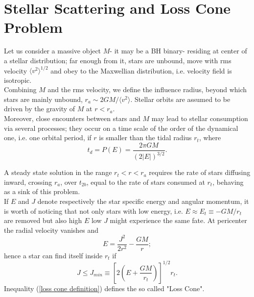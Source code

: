 \newpage















\section{Stellar Scattering and Loss Cone Problem}\label{sec:Loss Cone}
\cite{lightman_loss-cone}Let us consider a massive object $M$- it may be a BH binary- residing at center of a stellar distribution; far enough from it, stars are unbound, move with rms velocity $\langle v^2\rangle^{1/2}$ and obey to the Maxwellian distribution, i.e. velocity field is isotropic.\\Combining $M$ and the rms velocity, we define the influence radius, beyond which stars are mainly unbound, $r_a\sim 2GM/\langle v^2\rangle$. Stellar orbits are assumed to be driven by the gravity of $M$ at $r<r_a$.\\Moreover, close encounters between stars and $M$ may lead to stellar consumption via several processes; they occur on a time scale of the order of the dynamical one, i.e. one orbital period, if $r$ is smaller than the tidal radius $r_t$, where
\begin{equation}
    t_d=P(E)=\frac{2\pi GM}{(2|E|)^{3/2}}.
\end{equation}

A steady state solution in the range $r_t<r<r_a$ requires the rate of stars diffusing inward, crossing $r_a$, over $t_{2b}$, equal to the rate of stars consumed at $r_t$, behaving as a sink of this problem. \\If $E$ and $J$ denote respectively the star specific energy and angular momentum, it is worth of noticing  that  not only stars with low energy, i.e. $E\approx E_t\equiv -GM/r_t$ are removed but also high $E$ low $J$ might experience the same fate. At pericenter the radial velocity vanishes and 
\begin{equation}
    E=\frac{J^2}{2r^2}-\frac{GM}{r};
\end{equation}
hence a star can find itself inside $r_t$ if 
\begin{equation}\label{loss cone definition}
    J\le J_{min}\equiv \left[2\left(E+\frac{GM}{r_t}\right)\right]^{1/2}r_t.
\end{equation}
Inequality (\ref{loss cone definition}) defines the so called "Loss Cone".

